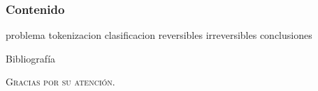 \documentclass{beamer}
\begin{document}
  {
  \frame{\titlepage}}

  \begin{frame}
    \frametitle{Contenido}
    \setcounter{tocdepth}{1}
    \tableofcontents
  \end{frame}

  \setlength{\parskip}{0.5em}

  {problema}
  {tokenizacion}
  {clasificacion}
  {reversibles}
  {irreversibles}
  {conclusiones}

  \begin{frame}[allowframebreaks]{Bibliografía}
    \printbibliography
  \end{frame}

  \begin{frame}{}
    \centering \Huge
    \textsc{Gracias por su atención.}
  \end{frame}

  \setlength{\parskip}{0.0em}

  {
  \frame{\titlepage}}
\end{document}
